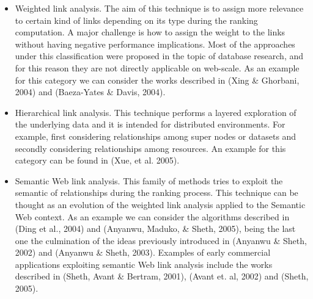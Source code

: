 \begin{itemize}
\item Weighted link analysis. The aim of this technique is to assign more relevance to certain kind of links depending on its type during the ranking 
computation. A major challenge is how to assign the weight to the links without having negative performance implications. Most of the approaches 
under this classification were proposed in the topic of database research, and for this reason they are not directly applicable on web-scale. 
As an example for this category we can consider the works described in \cite{}(Xing \& Ghorbani, 2004) and \cite{}(Baeza-Yates \& Davis, 2004).
\item Hierarchical link analysis. This technique performs a layered exploration of the underlying data and it is intended for distributed environments. 
For example, first considering relationships among super nodes or datasets and secondly considering relationships among resources. An example for this 
category can be found in \cite{}(Xue, et al. 2005).
\item Semantic Web link analysis. This family of methods tries to exploit the semantic of relationships during the ranking process. This technique can 
be thought as an evolution of the weighted link analysis applied to the Semantic Web context. As an example we can consider the algorithms described 
in \cite{}(Ding et al., 2004) and \cite{}(Anyanwu, Maduko, \& Sheth, 2005), being the last one the culmination of the ideas previously introduced in 
\cite{}(Anyanwu \& Sheth, 2002) and \cite{}(Anyanwu \& Sheth, 2003). Examples of early commercial applications exploiting semantic Web link analysis include the 
works described in \cite{}(Sheth, Avant \& Bertram, 2001), \cite{}(Avant et. al, 2002) and \cite{}(Sheth, 2005).
\end{itemize}

